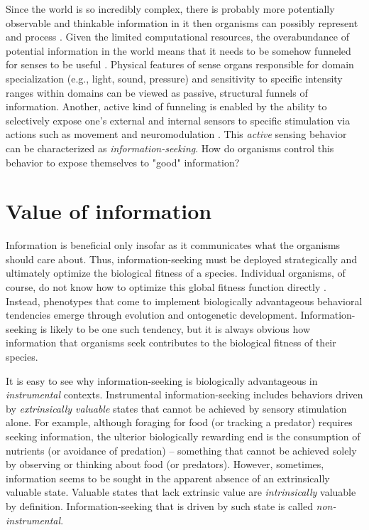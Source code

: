 Since the world is so incredibly complex, there is probably more potentially observable and thinkable information in it then organisms can possibly represent and process \cite{kolmogorov1965three}. Given the limited computational resources, the overabundance of potential information in the world means that it needs to be somehow funneled for senses to be useful \cite{gottlieb_towards_2018}. Physical features of sense organs responsible for domain specialization (e.g., light, sound, pressure) and sensitivity to specific intensity ranges within domains \cite[e.g.,][]{schwab_evolution_2018} can be viewed as passive, structural funnels of information. Another, active kind of funneling is enabled by the ability to selectively expose one's external and internal sensors to specific stimulation via actions such as movement \cite[e.g. ]{gottlieb_information-seeking_2013} and neuromodulation \cite[e.g. ]{yu_uncertainty_2005}. This \emph{active} sensing behavior can be characterized as \emph{information-seeking}. How do organisms control this behavior to expose themselves to "good" information?

\section{Value of information}

Information is beneficial only insofar as it communicates what the organisms should care about. Thus, information-seeking must be deployed strategically and ultimately optimize the biological fitness of a species. Individual organisms, of course, do not know how to optimize this global fitness function directly \cite{ten_berge_procedural_1999,singh_intrinsically_2010,gottlieb_information-seeking_2013}. Instead, phenotypes that come to implement biologically advantageous behavioral tendencies emerge through evolution and ontogenetic development. Information-seeking is likely to be one such tendency, but it is always obvious how information that organisms seek contributes to the biological fitness of their species.

It is easy to see why information-seeking is biologically advantageous in \emph{instrumental} contexts. Instrumental information-seeking includes behaviors driven by \emph{extrinsically valuable} states that cannot be achieved by sensory stimulation alone. For example, although foraging for food (or tracking a predator) requires seeking information, the ulterior biologically rewarding end is the consumption of nutrients (or avoidance of predation) -- something that cannot be achieved solely by observing or thinking about food (or predators). However, sometimes, information seems to be sought in the apparent absence of an extrinsically valuable state. Valuable states that lack extrinsic value are \emph{intrinsically} valuable by definition. Information-seeking that is driven by such state is called \emph{non-instrumental}.

